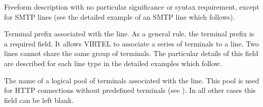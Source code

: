 \documentclass[letterpaper,10pt,english]{sphinxmanual}
\begin{document}
\begin{description}
\begin{sphinxVerbatim}[commandchars=\\\{\}]
     
 
 


     
 
 
\end{sphinxVerbatim}

\sphinxAtStartPar
Free\sphinxhyphen{}form description with no particular significance or syntax requirement, except for SMTP lines (see the detailed example of an SMTP line which follows).

\sphinxAtStartPar
Terminal prefix associated with the line. As a general rule, the terminal prefix is a required field. It allows VIRTEL to associate a series of terminals to a line. Two lines cannot share the same group of terminals. The particular details of this field are described for each line type in the detailed examples which follow.

\sphinxAtStartPar
The name of a logical pool of terminals associated with the line. This pool is used for HTTP connections without predefined terminals
(see {\hyperref[\detokenize{connectivity_guide:v462cn-forceluname}]{}}). In all other cases this field can be left blank.


\end{description}
\end{document}
